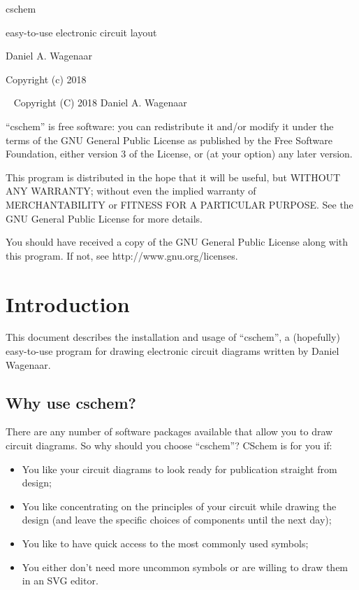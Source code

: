 \documentclass[11pt]{report}
\begin{document}
\thispagestyle{empty}
\begin{centering}
  {\Huge cschem}
  \vskip30pt

  {\Large easy-to-use electronic circuit layout}
  \vskip60pt

  {\large Daniel A. Wagenaar}
  \vfill
  
  {Copyright (c) 2018}
  
\end{centering}
\pagebreak
~
\vfill
\noindent Copyright (C) 2018 Daniel A. Wagenaar\medskip

``cschem'' is free software: you can redistribute it and/or modify
it under the terms of the GNU General Public License as published by
the Free Software Foundation, either version 3 of the License, or
(at your option) any later version.

This program is distributed in the hope that it will be useful,
but WITHOUT ANY WARRANTY; without even the implied warranty of
MERCHANTABILITY or FITNESS FOR A PARTICULAR PURPOSE.  See the
GNU General Public License for more details.

You should have received a copy of the GNU General Public License
along with this program.  If not, see http://www.gnu.org/licenses.
\pagebreak

\chapter{Introduction}

This document describes the installation and usage of ``cschem'', a
(hopefully) easy-to-use program for drawing electronic circuit
diagrams written by Daniel Wagenaar. 

\section{Why use cschem?}

There are any number of software packages available that allow you to
draw circuit diagrams. So why should you choose ``cschem''? CSchem is
for you if:
\begin{itemize}
  \item You like your circuit diagrams to look ready for publication
    straight from design;
  \item You like concentrating on the principles of your circuit while
    drawing the design (and leave the specific choices of components
    until the next day);
  \item You like to have quick access to the most commonly used
    symbols;
    \item You either don't need more uncommon symbols or are willing
      to draw them in an SVG editor.
\end{itemize}\pagebreak
\end{document}

